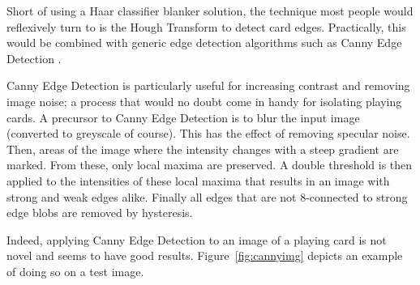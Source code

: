 \documentclass[a4paper,12pt,notitlepage]{article}
\begin{document}
			Short of using a Haar classifier blanker solution, the technique most people would reflexively turn to is the Hough Transform \autocite{duda1972use} to detect card edges. Practically, this would be combined with generic edge detection algorithms such as Canny Edge Detection \autocite{canny1986computational}.

			Canny Edge Detection is particularly useful for increasing contrast and removing image noise; a process that would no doubt come in handy for isolating playing cards. A precursor to Canny Edge Detection is to blur the input image (converted to greyscale of course). This has the effect of removing specular noise. Then, areas of the image where the intensity changes with a steep gradient are marked. From these, only local maxima are preserved. A double threshold is then applied to the intensities of these local maxima that results in an image with strong and weak edges alike. Finally all edges that are not 8-connected to strong edge blobs are removed by hysteresis.

			Indeed, applying Canny Edge Detection to an image of a playing card is not novel and seems to have good results. Figure~\ref{fig:cannyimg} depicts an example of doing so on a test image.
\end{document}
